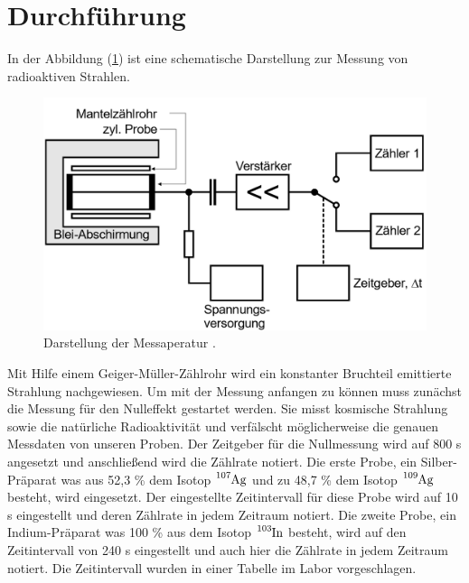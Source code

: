 \section{Durchführung}
In der Abbildung (\ref{abb:2}) ist eine schematische Darstellung zur Messung von radioaktiven
Strahlen.
\begin{figure}[H]
  \centering
  \includegraphics[width=\textwidth]{content/Aufbau.png}
  \caption{Darstellung der Messaperatur \cite{1}.}
  \label{abb:2}
\end{figure}
Mit Hilfe einem Geiger-Müller-Zählrohr wird ein konstanter Bruchteil emittierte Strahlung nachgewiesen.
Um mit der Messung anfangen zu können muss zunächst die Messung für den Nulleffekt gestartet werden.
Sie misst kosmische Strahlung sowie die natürliche Radioaktivität und verfälscht möglicherweise die genauen
Messdaten von unseren Proben.
Der Zeitgeber für die Nullmessung wird auf 800 s angesetzt und anschließend wird die Zählrate notiert.
Die erste Probe, ein Silber-Präparat was aus 52,3 \% dem Isotop $\ce{^{107}_{}Ag}$ und zu 48,7 \% dem Isotop $\ce{^{109}_{}Ag}$ besteht, wird eingesetzt.
Der eingestellte Zeitintervall für diese Probe wird
auf 10 s eingestellt und deren Zählrate in jedem Zeitraum notiert.  Die zweite Probe, ein Indium-Präparat was 100 \% aus dem Isotop $\ce{^{103}_{}In}$ besteht,
wird auf den Zeitintervall von 240 s eingestellt und auch hier die Zählrate in jedem Zeitraum notiert.
Die Zeitintervall wurden in einer Tabelle im Labor vorgeschlagen.
